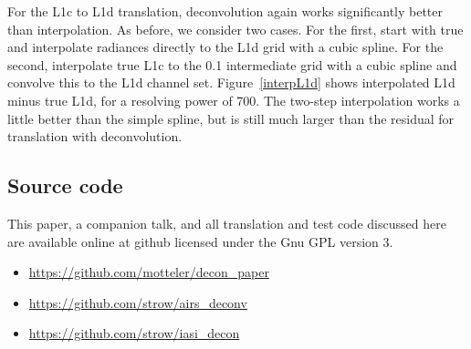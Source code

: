 \documentclass[10pt,twocolumn]{article}
\begin{document}
For the {\airs} L1c to L1d translation, deconvolution again works
significantly better than interpolation.  As before, we consider two
cases.  For the first, start with true {\airs} and interpolate
radiances directly to the L1d grid with a cubic spline.  For the
second, interpolate true L1c to the 0.1 {\wn} intermediate grid with
a cubic spline and convolve this to the L1d channel set.
Figure~\ref{interpL1d} shows interpolated L1d minus true L1d, for a
resolving power of 700.  The two-step interpolation works a little
better than the simple spline, but is still much larger than the
residual for translation with deconvolution.

\subsection{Source code}

This paper, a companion talk, and all translation and test code
discussed here are available online at github licensed under the
Gnu GPL version 3.\vspace{-2mm}

\begin{itemize}
   \item \url{https://github.com/motteler/decon_paper}\vspace{-3mm}
   \item \url{https://github.com/strow/airs_deconv}\vspace{-3mm}
   \item \url{https://github.com/strow/iasi_decon}
\end{itemize}



\end{document}
